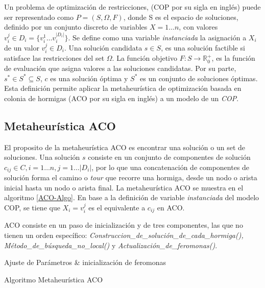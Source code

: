 Un problema de optimización de restricciones, (COP por su sigla en ingl\'es) puede ser representado como $P = (S, \Omega, F)$, donde S es el espacio de soluciones, definido por un conjunto discreto de variables $X = 1 \dotsc n$, con valores $v_{i}^{j} \in D_{i} = \{v_{i}^{1} \dotsc  v_{i}^{|D_{i}|}\}$. Se define como una variable {\it instanciada} la asignaci\'on a $X_i$ de un valor $v_{i}^{j} \in D_i$. Una solución candidata $s \in S$, es una soluci\'on factible si satisface las restricciones del set $\Omega$. La funci\'on objetivo $F: S\rightarrow \mathbb R_{0}^{+}$, es la funci\'on de evaluaci\'on que asigna valores a las soluciones candidatas. Por su parte, $s^{*} \in S^{*} \subseteq S $, $c$ es una soluci\'on \'optima y $S^{*}$ es un conjunto de soluciones \'optimas\cite{socha2008ant}.
Esta definici\'on permite aplicar la metaheur\'istica de optimizaci\'on basada en colonia de hormigas (ACO por su sigla en ingl\'es) a un modelo de un {\it COP}.

\subsection{Metaheur\'istica ACO}
El proposito de la metaheur\'istica ACO es encontrar una soluci\'on o un set de soluciones. Una soluci\'on $s$ consiste en un conjunto de componentes de soluci\'on $c_{ij} \in C, i = 1 \dotsc n, j = 1 \dotsc |D_i|$, por lo que una concatenaci\'on de componentes de soluci\'on forma el camino o {\it tour} que recorre una hormiga, desde un nodo o arista inicial hasta un nodo o arista final. La metaheur\'istica ACO se muestra en el algoritmo \ref{ACO-Algo}. En base a la definici\'on de variable {\it instanciada} del modelo COP, se tiene que $X_i = v_{i}^{j}$ es el equivalente a $c_{ij}$ en ACO.

ACO consiste en un paso de inicializaci\'on y de tres componentes, las que no tienen un orden espec\'ifico: {\it Construccion\_de\_soluci\'on\_de\_cada\_hormiga(),  M\'etodo\_de\_b\'usqueda\_no\_local()} y {\it Actualizaci\'on\_de\_feromonas()}.


\begin{algorithm}[H]
\SetAlgoLined
{}
 Ajuste de Par\'ametros \& inicializaci\'on de feromonas \;
 \caption{Algoritmo Metaheur\'istica ACO}\label{ACO-Algo}
\end{algorithm}


